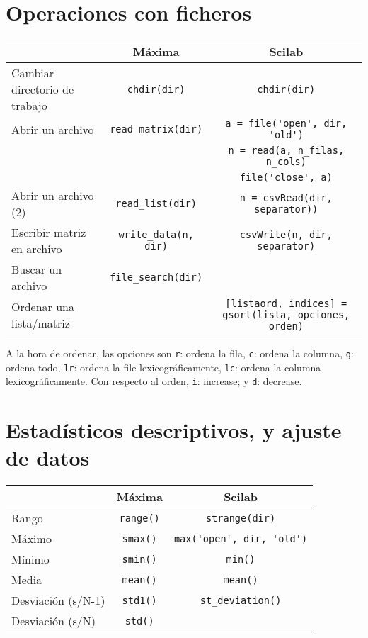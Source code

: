\documentclass[a4paper]{article}
\begin{document}
\raggedright
\section{Operaciones con ficheros}
\centering
\begin{tabular}{lcc}
	& Máxima & Scilab \\ \midrule
	Cambiar directorio de trabajo & \verb|chdir(dir)|  & \verb|chdir(dir)| \\
	Abrir un archivo & \verb|read_matrix(dir)| & \verb|a = file('open', dir, 'old')|   \\
		 &  & \verb|n = read(a, n_filas, n_cols)|  \\
			 &  &  \verb|file('close', a)| \\
	Abrir un archivo (2) & \verb|read_list(dir)| & \verb|n = csvRead(dir, separator))|\\
	Escribir matriz en archivo & \verb|write_data(n, dir)| &\verb|csvWrite(n, dir, separator)|\\
	Buscar un archivo & \verb|file_search(dir)| & \\
	Ordenar una lista/matriz & & \verb|[listaord, indices] = gsort(lista, opciones, orden)|
\end{tabular}

A la hora de ordenar, las opciones son \verb|r|: ordena la fila, \verb|c|: ordena la columna, \verb|g|: ordena todo, \verb|lr|: ordena la file lexicográficamente, \verb|lc|: ordena la columna lexicográficamente.
Con respecto al orden, \verb|i|: increase; y \verb|d|: decrease. 

\raggedright
\section{Estadísticos descriptivos, y ajuste de datos}
\centering
\begin{tabular}{lcc}
	& Máxima & Scilab \\ \midrule
	Rango & \verb|range()|  & \verb|strange(dir)| \\
    Máximo & \verb|smax()| & \verb|max('open', dir, 'old')|   \\
	Mínimo & \verb|smin()|  & \verb|min()|  \\
	Media& \verb|mean()| &  \verb|mean()| \\
	Desviación (s/N-1)& \verb|std1()| & \verb|st_deviation()| \\	
	Desviación (s/N)& \verb|std()| &  \\

\end{tabular}
\end{document}
